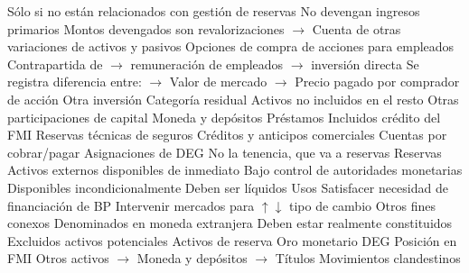 \documentclass{nuevotema}
\begin{document}
\begin{esquemal}
				\4[] Sólo si no están relacionados con gestión de reservas
			\3 No devengan ingresos primarios
				\4[] Montos devengados son revalorizaciones
				\4[] $\to$ Cuenta de otras variaciones de activos y pasivos
			\3 Opciones de compra de acciones para empleados
				\4[] Contrapartida de
				\4[] $\to$ remuneración de empleados
				\4[] $\to$ inversión directa
				\4[] Se registra diferencia entre:
				\4[] $\to$ Valor de mercado
				\4[] $\to$ Precio pagado por comprador de acción
		\2 Otra inversión
			\3 Categoría residual
				\4[] Activos no incluidos en el resto
			\3 Otras participaciones de capital
			\3 Moneda y depósitos
			\3 Préstamos
				\4[] Incluidos crédito del FMI
			\3 Reservas técnicas de seguros
			\3 Créditos y anticipos comerciales
			\3 Cuentas por cobrar/pagar
			\3 Asignaciones de DEG
				\4[] No la tenencia, que va a reservas
		\2 Reservas
			\3 Activos externos disponibles de inmediato
				\4[] Bajo control de autoridades monetarias
				\4[] Disponibles incondicionalmente
				\4[] Deben ser líquidos
			\3 Usos
				\4[] Satisfacer necesidad de financiación de BP
				\4[] Intervenir mercados para $\uparrow \downarrow$ tipo de cambio
				\4[] Otros fines conexos
			\3 Denominados en moneda extranjera
			\3 Deben estar realmente constituidos
				\4[] Excluidos activos potenciales
			\3 Activos de reserva
				\4[] Oro monetario
				\4[] DEG
				\4[] Posición en FMI
				\4[] Otros activos
				\4[] $\to$ Moneda y depósitos
				\4[] $\to$ Títulos
		\2 Movimientos clandestinos
	\1 


\end{esquemal}
\end{document}

